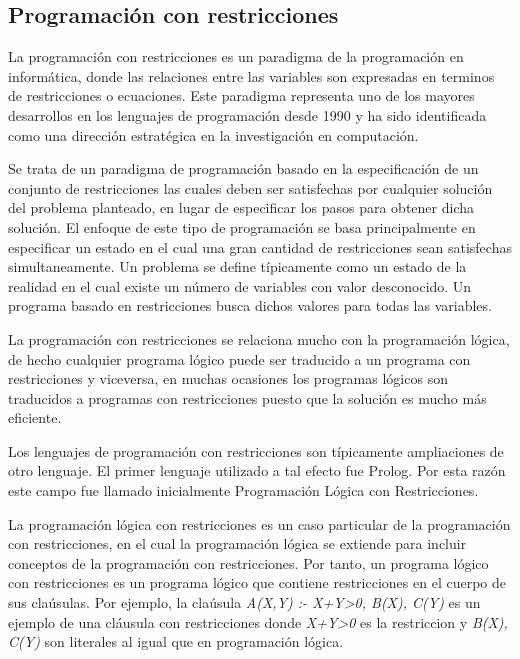 \subsection{Programaci\'on con restricciones}

La programaci\'on con restricciones es un paradigma de la programaci\'on en inform\'atica, donde las relaciones entre las variables son expresadas en terminos de restricciones o ecuaciones. Este paradigma representa uno de los mayores desarrollos en los lenguajes de programaci\'on desde 1990 y ha sido identificada como una direcci\'on estrat\'egica en la investigaci\'on en computaci\'on.

Se trata de un paradigma de programaci\'on basado en la especificaci\'on de un conjunto de restricciones las cuales deben ser satisfechas por cualquier soluci\'on del problema planteado, en lugar de especificar los pasos para obtener dicha soluci\'on. El enfoque de este tipo de programaci\'on se basa principalmente en especificar un estado en el cual una gran cantidad de restricciones sean satisfechas simultaneamente. Un problema se define t\'ipicamente como un estado de la realidad	en el cual existe un n\'umero de variables con valor desconocido. Un programa basado en restricciones busca dichos valores para todas las variables.

La programaci\'on con restricciones se relaciona mucho con la programaci\'on l\'ogica, de hecho cualquier programa l\'ogico puede ser traducido a un programa con restricciones y viceversa, en muchas ocasiones los programas l\'ogicos son traducidos a programas con restricciones puesto que la soluci\'on es mucho m\'as eficiente. 

Los lenguajes de programaci\'on con restricciones son t\'ipicamente ampliaciones de otro lenguaje. El primer lenguaje utilizado a tal efecto fue Prolog. Por esta raz\'on este campo fue llamado inicialmente Programaci\'on L\'ogica con Restricciones.

La programaci\'on l\'ogica con restricciones es un caso particular de la programaci\'on con restricciones, en el cual la programaci\'on l\'ogica se extiende para incluir conceptos de la programaci\'on con restricciones. Por tanto, un programa l\'ogico con restricciones es un programa l\'ogico que contiene restricciones en el cuerpo de sus cla\'usulas. Por ejemplo, la cla\'usula {\it A(X,Y) :- X+Y>0, B(X), C(Y)} es un ejemplo de una cl\'ausula con restricciones donde {\it X+Y>0} es la restriccion y {\it B(X), C(Y)} son literales al igual que en programaci\'on l\'ogica.

